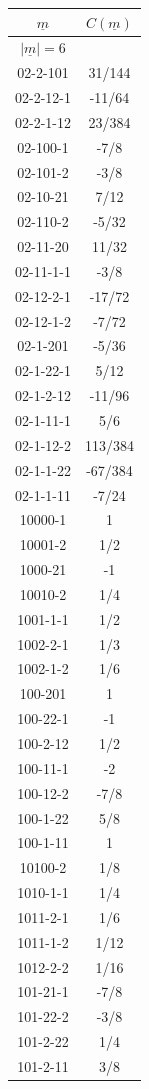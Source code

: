 \begin{tabular}[t]{|cc|}
\hline
$\underline{m}$ & $C(\underline{m})$\\
\hline\hline
$|\underline{m}|=6$&\\
\hline
02-2-101 &  31/144\\
02-2-12-1 &  -11/64\\
02-2-1-12 &  23/384\\
02-100-1 &  -7/8\\
02-101-2 &  -3/8\\
02-10-21 &  7/12\\
02-110-2 &  -5/32\\
02-11-20 &  11/32\\
02-11-1-1 &  -3/8\\
02-12-2-1 &  -17/72\\
02-12-1-2 &  -7/72\\
02-1-201 &  -5/36\\
02-1-22-1 &  5/12\\
02-1-2-12 &  -11/96\\
02-1-11-1 &  5/6\\
02-1-12-2 &  113/384\\
02-1-1-22 &  -67/384\\
02-1-1-11 &  -7/24\\
10000-1 &  1\\
10001-2 &  1/2\\
1000-21 &  -1\\
10010-2 &  1/4\\
1001-1-1 &  1/2\\
1002-2-1 &  1/3\\
1002-1-2 &  1/6\\
100-201 &  1\\
100-22-1 &  -1\\
100-2-12 &  1/2\\
100-11-1 &  -2\\
100-12-2 &  -7/8\\
100-1-22 &  5/8\\
100-1-11 &  1\\
10100-2 &  1/8\\
1010-1-1 &  1/4\\
1011-2-1 &  1/6\\
1011-1-2 &  1/12\\
1012-2-2 &  1/16\\
101-21-1 &  -7/8\\
101-22-2 &  -3/8\\
101-2-22 &  1/4\\
101-2-11 &  3/8\\

\end{tabular}
